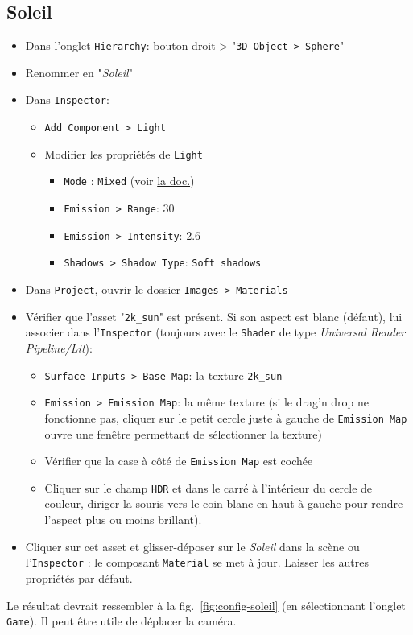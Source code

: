 \documentclass[a4paper,10pt]{article}
\newenvironment{solution}%
{\begin{tcolorbox}[breakable,colback=red!5!white,colframe=red!75!black,title=Solution]}%
{\end{tcolorbox}}
\begin{document}
\ifversionenseignant
\begin{solution}
	\subsection{Soleil}
	
	\begin{itemize}
		\item Dans l'onglet \texttt{Hierarchy}:  bouton droit > "\texttt{3D Object > Sphere}"
		\item Renommer en "\textit{Soleil}"
		\item Dans \texttt{Inspector}:
		\begin{itemize}
			\item \texttt{Add Component > Light}
			\item Modifier les propriétés de \texttt{Light}
			\begin{itemize}				
				\item \texttt{Mode} : \texttt{Mixed} (voir \href{https://docs.unity3d.com/Manual/LightMode-Mixed.html}{la doc.})
				\item \texttt{Emission > Range}: $30$
				\item \texttt{Emission > Intensity}: $2.6$
				\item \texttt{Shadows > Shadow Type}: \texttt{Soft shadows}
			\end{itemize}
		\end{itemize}
		\item Dans \texttt{Project}, ouvrir le dossier \texttt{Images > Materials}
		\item Vérifier que l'asset "\texttt{2k\_sun}" est présent. Si son aspect est blanc (défaut), lui associer dans l'\texttt{Inspector} (toujours avec le  \texttt{Shader} de type \textit{Universal Render Pipeline/Lit}):
		\begin{itemize}
			\item \texttt{Surface Inputs > Base Map}: la texture \texttt{2k\_sun}
			\item \texttt{Emission > Emission Map}: la même texture (si le drag'n drop ne fonctionne pas, cliquer sur le petit cercle juste à gauche de \texttt{Emission Map} ouvre une fenêtre permettant de sélectionner la texture)
			\item Vérifier que la case à côté de \texttt{Emission Map} est cochée
			\item Cliquer sur le champ \texttt{HDR} et dans le carré à l'intérieur du cercle de couleur, diriger la souris vers le coin blanc en haut à gauche pour rendre l'aspect plus ou moins brillant).
		\end{itemize}
		\item Cliquer sur cet asset et glisser-déposer sur le \textit{Soleil} dans la scène ou l'\texttt{Inspector} : le composant \texttt{Material} se met à jour. Laisser les autres propriétés par défaut.
	\end{itemize}

Le résultat devrait ressembler à la fig.~\ref{fig:config-soleil} (en sélectionnant l'onglet \texttt{Game}). Il peut être utile de déplacer la caméra.
\end{solution}
\end{document}
